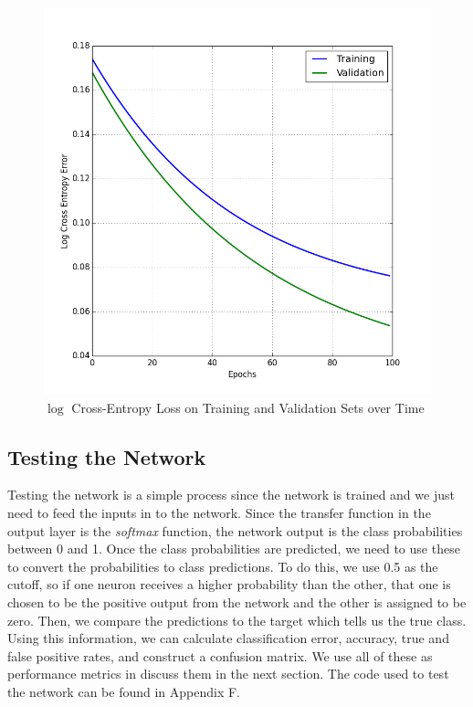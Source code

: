 \documentclass[12pt,halfline,a4paper]{ouparticle}
\begin{document}
\begin{figure}[H]
\centering
\includegraphics[width = 5in]{figs/CEloss.png}
\caption{$\log$ Cross-Entropy Loss on Training and Validation Sets over Time}
\end{figure}  

\subsection{Testing the Network}
Testing the network is a simple process since the network is trained and we just need to feed the inputs in to the network. Since the transfer function in the output layer is the \emph{softmax} function, the network output is the class probabilities between 0 and 1. Once the class probabilities are predicted, we need to use these to convert the probabilities to class predictions. To do this, we use 0.5 as the cutoff, so if one neuron receives a higher probability than the other, that one is chosen to be the positive output from the network and the other is assigned to be zero. Then, we compare the predictions to the target which tells us the true class. Using this information, we can calculate classification error, accuracy, true and false positive rates, and construct a confusion matrix. We use all of these as performance metrics in discuss them in the next section. The code used to test the network can be found in Appendix F.
\end{document}
